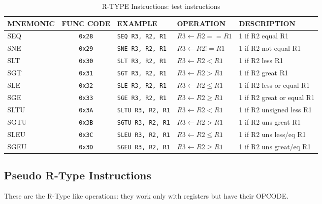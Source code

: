 \begin{table}[H]
\begin{tabularx}{\textwidth}{|l|c|l|l|X|}
    \hline
    MNEMONIC & FUNC CODE & EXAMPLE & OPERATION & DESCRIPTION \\ 
    \hline
    SEQ & \texttt{0x28} & \texttt{SEQ R3, R2, R1} & $R3 \leftarrow R2 == R1$ & 1 if R2 equal R1\\ 
    \hline
    SNE & \texttt{0x29} & \texttt{SNE R3, R2, R1} & $R3 \leftarrow R2 != R1$ & 1 if R2 not equal R1\\ 
    \hline
    SLT & \texttt{0x30} & \texttt{SLT R3, R2, R1} & $R3 \leftarrow R2 < R1$ & 1 if R2 less R1\\ 
    \hline
    SGT & \texttt{0x31} & \texttt{SGT R3, R2, R1} & $R3 \leftarrow R2 > R1$ & 1 if R2 great R1\\ 
    \hline
    SLE & \texttt{0x32} & \texttt{SLE R3, R2, R1} & $R3 \leftarrow R2 \leq R1$ & 1 if R2 less or equal R1\\ 
    \hline
    SGE & \texttt{0x33} & \texttt{SGE R3, R2, R1} & $R3 \leftarrow R2 \geq R1$ & 1 if R2 great or equal R1\\ 
    \hline
    SLTU & \texttt{0x3A} & \texttt{SLTU R3, R2, R1} & $R3 \leftarrow R2 < R1$ & 1 if R2 unsigned less R1\\ 
    \hline
    SGTU & \texttt{0x3B} & \texttt{SGTU R3, R2, R1} & $R3 \leftarrow R2 > R1$ & 1 if R2 uns great R1\\ 
    \hline
    SLEU & \texttt{0x3C} & \texttt{SLEU R3, R2, R1} & $R3 \leftarrow R2 \leq R1$ & 1 if R2 uns less/eq R1\\ 
    \hline
    SGEU & \texttt{0x3D} & \texttt{SGEU R3, R2, R1} & $R3 \leftarrow R2 \geq R1$ & 1 if R2 uns great/eq R1\\ 
    \hline
\end{tabularx}
\caption{R-TYPE Instructions: test instructions}
\label{table:r_type_test}
\end{table}

\subsection{Pseudo R-Type Instructions}

These are the R-Type like operations: they work only with registers but have their OPCODE.

